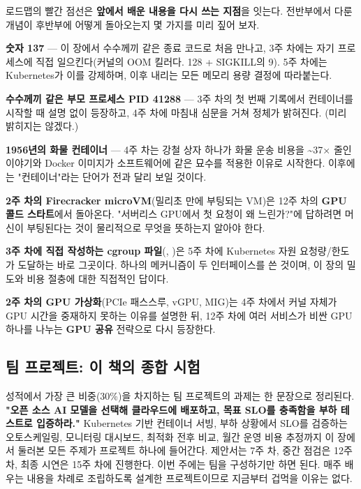 로드맵의 빨간 점선은 \textbf{앞에서 배운 내용을 다시 쓰는 지점}을 잇는다. 전반부에서 다룬 개념이 후반부에 어떻게 돌아오는지 몇 가지를 미리 짚어 보자.

\begin{tbbitemize}
  \item \textbf{숫자 137} — 이 장에서 수수께끼 같은 종료 코드로 처음 만나고, 3주 차에는 자기 프로세스에 직접 일으킨다(커널의 OOM 킬러다. 128 + SIGKILL의 9). 5주 차에는 Kubernetes가 이를 강제하며, 이후 내리는 모든 메모리 용량 결정에 따라붙는다.
  \item \textbf{수수께끼 같은 부모 프로세스 PID 41288} — 3주 차의 첫 번째 기록에서 컨테이너를 시작할 때 설명 없이 등장하고, 4주 차에 마침내 심문을 거쳐 정체가 밝혀진다. (미리 밝히지는 않겠다.)
  \item \textbf{1956년의 화물 컨테이너} — 4주 차는 강철 상자 하나가 화물 운송 비용을 \textasciitilde{}37× 줄인 이야기와 Docker 이미지가 소프트웨어에 같은 묘수를 적용한 이유로 시작한다. 이후에는 "컨테이너"라는 단어가 전과 달리 보일 것이다.
  \item \textbf{2주 차의 Firecracker microVM}(밀리초 만에 부팅되는 VM)은 12주 차의 \textbf{GPU 콜드 스타트}에서 돌아온다. "서버리스 GPU에서 첫 요청이 왜 느린가?"에 답하려면 머신이 부팅된다는 것이 물리적으로 무엇을 뜻하는지 알아야 한다.
  \item \textbf{3주 차에 직접 작성하는 cgroup 파일}(, )은 5주 차에 Kubernetes 자원 요청량/한도가 도달하는 바로 그곳이다. 하나의 메커니즘이 두 인터페이스를 쓴 것이며, 이 장의 밀도와 비용 절충에 대한 직접적인 답이다.
  \item \textbf{2주 차의 GPU 가상화}(PCIe 패스스루, vGPU, MIG)는 4주 차에서 커널 자체가 GPU 시간을 중재하지 못하는 이유를 설명한 뒤, 12주 차에 여러 서비스가 비싼 GPU 하나를 나누는 \textbf{GPU 공유} 전략으로 다시 등장한다.
\end{tbbitemize}

\subsection*{팀 프로젝트: 이 책의 종합 시험}

성적에서 가장 큰 비중(30\%)을 차지하는 팀 프로젝트의 과제는 한 문장으로 정리된다. \textbf{"오픈 소스 AI 모델을 선택해 클라우드에 배포하고, 목표 SLO를 충족함을 부하 테스트로 입증하라."} Kubernetes 기반 컨테이너 서빙, 부하 상황에서 SLO를 검증하는 오토스케일링, 모니터링 대시보드, 최적화 전후 비교, 월간 운영 비용 추정까지 이 장에서 둘러본 모든 주제가 프로젝트 하나에 들어간다. 제안서는 7주 차, 중간 점검은 12주 차, 최종 시연은 15주 차에 진행한다. 이번 주에는 팀을 구성하기만 하면 된다. 매주 배우는 내용을 차례로 조립하도록 설계한 프로젝트이므로 지금부터 겁먹을 이유는 없다.

